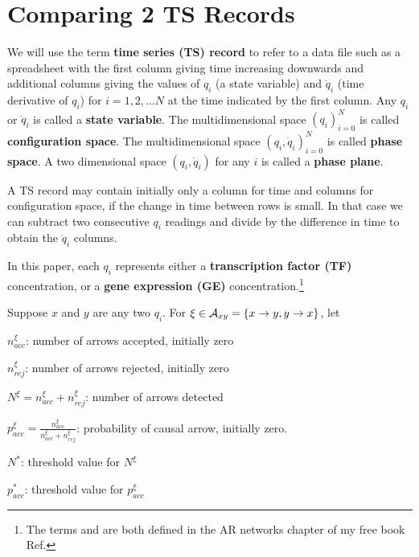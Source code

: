 \documentclass[12pt]{article}
\begin{document}
\section{Comparing 2 TS Records}


We will use the term {\bf time series (TS) record}
to refer to
a data file such as a spreadsheet with the first column 
giving time increasing downwards and additional columns giving the values
of $q_i$ (a state variable) and $\dot{q}_i$ (time derivative of $q_i$) for $i=1, 2, \ldots N$
at the time indicated by the first column.
Any $q_i$ or $\dot{q}_i$ is called a {\bf state variable}.
The multidimensional space $(q_i)_{i=0}^{N}$
is called {\bf configuration space}.
The multidimensional space $(q_i, \dot{q}_i)_{i=0}^{N}$
is called {\bf phase space}.
A two dimensional space $(q_i, \dot{q}_i)$ for any 
$i$ is called a {\bf phase plane}.

A TS record may contain initially only a column 
for time and columns for configuration space,
if the change in time between rows is small. 
In that case we can subtract two consecutive
$q_i$ readings and divide by the difference
in time to obtain the $\dot{q}_i$ columns.

In this paper, each $q_i$ represents either a {\bf transcription
factor (TF)} concentration, or a {\bf gene expression (GE)} concentration.\footnote{The 
terms 
and  are both defined
in the AR networks chapter of my free book Ref.\cite{Bayesuvius}}


Suppose $x$ and $y$
are any two $q_i$. For $\xi \in
{\cal A}_{xy}=
\{x\rightarrow y, y\rightarrow x\}$, let

$n_{acc}^{\xi}$: number of arrows 
accepted, initially zero

$n_{rej}^{\xi}$: number of arrows rejected, initially zero

$N^{\xi}=n_{acc}^\xi+ n_{rej}^\xi$: number of arrows detected

$p_{acc}^{\xi}=\frac{n_{acc}^{\xi}}
{n_{acc}^{\xi}+n_{rej}^{\xi}}$: probability of causal arrow, initially zero.

$N^*$: threshold value for
$N^\xi$

$p_{acc}^*$: threshold value for 
$p_{acc}^\xi$
\end{document}
